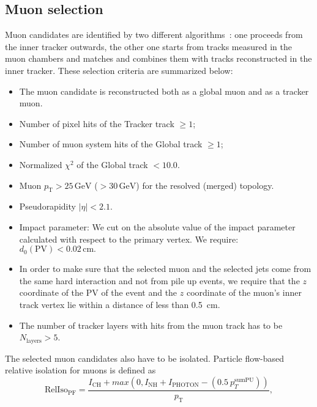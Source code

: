 \subsection{Muon selection}
\label{sec:muon_cuts}

Muon candidates are identified by two different
algorithms~\cite{MUONPAS}: one proceeds from the inner tracker outwards,
the other one starts from tracks measured in the muon chambers and matches
and combines them with tracks reconstructed in the inner tracker.
These selection criteria are summarized below:
\begin{itemize}
\item The muon candidate is reconstructed both as a global muon and
as a tracker muon.
\item Number of pixel hits of the Tracker track $\ge 1$;
\item Number of muon system hits of the Global track $\ge 1$;
\item Normalized $\chi^{2}$ of the Global track $< 10.0$.
\item Muon $p_{\mathrm{T}} > 25\,\mathrm{GeV}$ ($> 30\,\mathrm{GeV}$) for the resolved (merged) topology.
\item Pseudorapidity $|\eta| < 2.1$.
\item Impact parameter: We cut on the absolute value of the impact
parameter calculated with respect to the primary vertex. We require:
$d_0(\mathrm{PV}) < 0.02\,\mathrm{cm}.$
\item In order to make sure that the selected muon and the selected
jets come from the same hard interaction and not from pile up events,
we require that the $z$ coordinate of the PV of the event and the $z$
coordinate of the muon's inner track vertex lie within a distance of
less than 0.5~cm.
\item The number of tracker layers with hits from the muon track has to be
$N_{\mathrm{layers}} > 5$.
\end{itemize}

The selected muon candidates also have to be isolated. Particle
flow-based relative isolation for muons is defined as
\begin{equation*}
\mathrm{RelIso_{\mathrm{PF}}} = \frac{I_{\mathrm{CH}}+max(0,I_{\mathrm{NH}}+I_{\mathrm{PHOTON}}-(0.5~{p}_{T}^\mathrm{sumPU}))}{p_\mathrm{T}},
\end{equation*}

